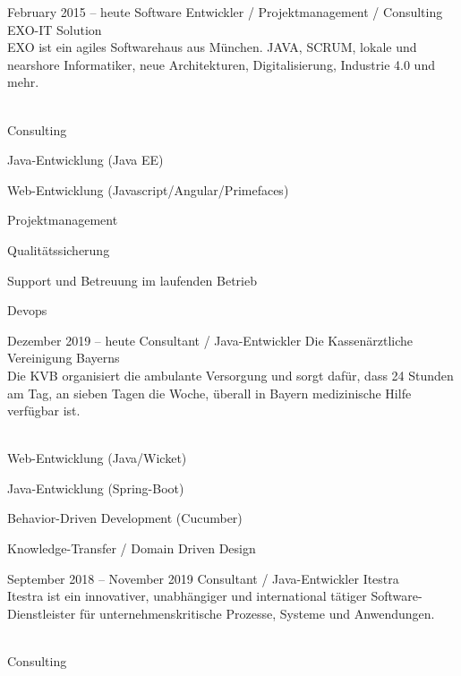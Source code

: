 \documentclass[fontsize=10pt]{tccv}
\begin{document}
\begin{eventlist}

\item{February 2015 -- heute}
     { Software Entwickler / Projektmanagement /  Consulting}
     {EXO-IT Solution}
\\
EXO ist ein agiles Softwarehaus aus München. JAVA, SCRUM, lokale und nearshore Informatiker, neue Architekturen, Digitalisierung, Industrie 4.0 und mehr.
\\\\
\begin{assignments}
\item{Consulting}
\item{Java-Entwicklung (Java EE)}
\item{Web-Entwicklung (Javascript/Angular/Primefaces)}
\item{Projektmanagement}
\item{Qualitätssicherung}
\item{Support und Betreuung im laufenden Betrieb }
\item{Devops}
\end{assignments}

\item{Dezember 2019 -- heute}
     {Consultant / Java-Entwickler}
     {Die Kassenärztliche Vereinigung Bayerns}
\\
Die KVB organisiert die ambulante Versorgung und sorgt dafür, dass 24 Stunden
am Tag, an sieben Tagen die Woche, überall in Bayern medizinische Hilfe
verfügbar ist.
\\\\
\begin{assignments}
\item{Web-Entwicklung (Java/Wicket)}
\item{Java-Entwicklung (Spring-Boot)}
\item{Behavior-Driven Development (Cucumber)}
\item{Knowledge-Transfer / Domain Driven Design}
\end{assignments}

\item{September 2018 -- November 2019}
     {Consultant / Java-Entwickler}
     {Itestra}
\\
Itestra ist ein innovativer, unabhängiger und international tätiger
Software-Dienstleister für unternehmenskritische Prozesse, Systeme und
Anwendungen.
\\\\
\begin{assignments}
\item{Consulting}
\end{assignments}



\end{eventlist}
\end{document}
